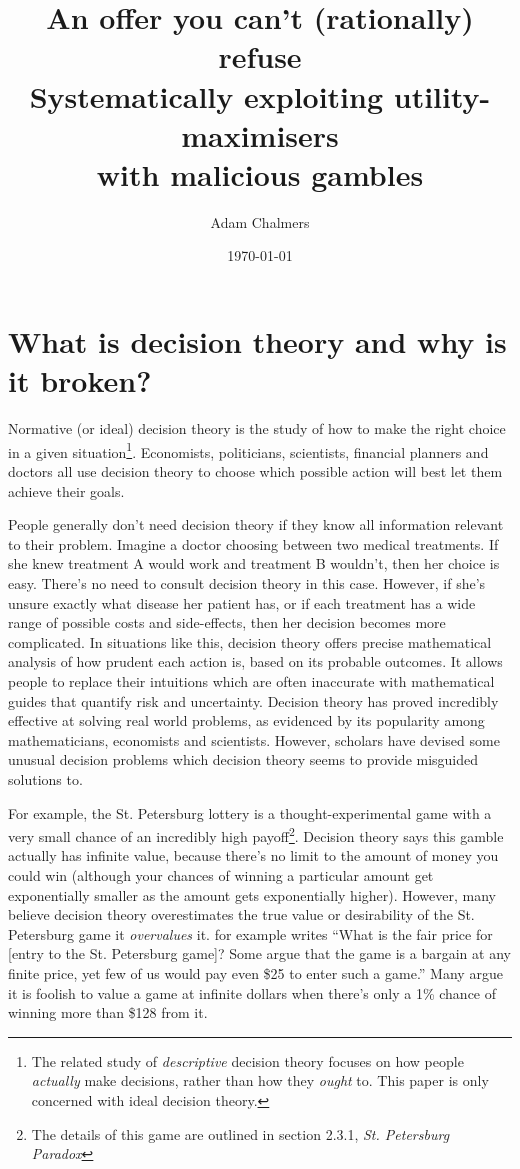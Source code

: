 \documentclass{article}
\title{%
  An offer you can't (rationally) refuse \\
  \large Systematically exploiting utility-maximisers \\
    with malicious gambles}
\author{Adam Chalmers}
\date{\today}
\begin{document}
\frenchspacing
\doublespacing
\maketitle

\section{What is decision theory and why is it broken?}

Normative (or ideal) decision theory is the study of how to make the right choice in a given situation\footnote{The related study of \textit{descriptive} decision theory focuses on how people \textit{actually} make decisions, rather than how they \textit{ought} to. This paper is only concerned with ideal decision theory.}. Economists, politicians, scientists, financial planners and doctors all use decision theory to choose which possible action will best let them achieve their goals.

People generally don't need decision theory if they know all information relevant to their problem. Imagine a doctor choosing between two medical treatments. If she knew treatment A would work and treatment B wouldn't, then her choice is easy. There's no need to consult decision theory in this case. However, if she's unsure exactly what disease her patient has, or if each treatment has a wide range of possible costs and side-effects, then her decision becomes more complicated. In situations like this, decision theory offers precise mathematical analysis of how prudent each action is, based on its probable outcomes. It allows people to replace their intuitions \textemdash{} which are often inaccurate \textemdash{} with mathematical guides that quantify risk and uncertainty. Decision theory has proved incredibly effective at solving real world problems, as evidenced by its popularity among mathematicians, economists and scientists. However, scholars have devised some unusual decision problems which decision theory seems to provide misguided solutions to. 

For example, the St. Petersburg lottery is a thought-experimental game with a very small chance of an incredibly high payoff\footnote{The details of this game are outlined in section 2.3.1, \textit{St. Petersburg Paradox}}. Decision theory says this gamble actually has infinite value, because there's no limit to the amount of money you could win (although your chances of winning a particular amount get exponentially smaller as the amount gets exponentially higher). However, many believe decision theory overestimates the true value or desirability of the St. Petersburg game \textemdash{} it \textit{overvalues} it. \citep{hacking1980strange} for example writes ``What is the fair price for [entry to the St. Petersburg game]? Some argue that the game is a bargain at any finite price, yet few of us would pay even \$25 to enter such a game.'' Many argue it is foolish to value a game at infinite dollars when there's only a 1\% chance of winning more than \$128 from it.
\end{document}
